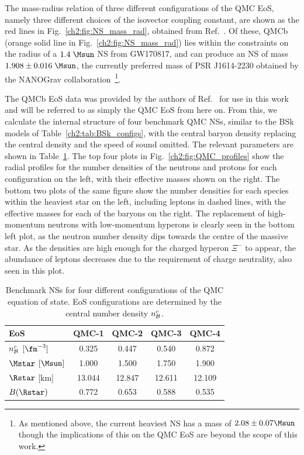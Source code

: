 The mass-radius relation of three different configurations of the QMC EoS, namely three different choices of the isovector coupling constant, are shown as the red lines in Fig.~\ref{ch2:fig:NS_mass_rad}, obtained from Ref.~\cite{Motta:2019tjc_Isovectoreffectsneutron}. Of these, QMCb (orange solid line in Fig.~\ref{ch2:fig:NS_mass_rad}) lies within the constraints on the radius of a $1.4\;\Msun$ NS from GW170817, and can produce an NS of mass $1.908 \pm 0.016\;\Msun$, the currently preferred mass of PSR J1614-2230 obtained by the NANOGrav collaboration~\cite{NANOGrav:2017wvv_apr_NANOGrav11yearData}\footnote{As mentioned above, the current heaviest NS has a mass of $2.08\pm 0.07\Msun$ though the implications of this on the QMC EoS are beyond the scope of this work.}.

The QMCb EoS data was provided by the authors of Ref.~\cite{Motta:2019tjc_Isovectoreffectsneutron} for use in this work and will be referred to as simply the QMC EoS from here on. From this, we calculate the internal structure of four benchmark QMC NSs, similar to the BSk models of Table~\ref{ch2:tab:BSk_configs}, with the central baryon density replacing the central density and the speed of sound omitted. The relevant parameters are shown in Table~\ref{ch2:tab:QMC_configs}. The top four plots in Fig.~\ref{ch2:fig:QMC_profiles} show the radial profiles for the number densities of the neutrons and protons for each configuration on the left, with their effective masses shown on the right. The bottom two plots of the same figure show the number densities for each species within the heaviest star on the left, including leptons in dashed lines, with the effective masses for each of the baryons on the right. The replacement of high-momentum neutrons with low-momentum hyperons is clearly seen in the bottom left plot, as the neutron number density dips towards the centre of the massive star. As the densities are high enough for the charged hyperon $\Xi^-$ to appear, the abundance of leptons decreases due to the requirement of charge neutrality, also seen in this plot. 

\begin{table}[t!bp]
    \centering
    \begin{tabular}{l c c c c}
    \toprule
    \bf EoS & \bf QMC-1 & \bf QMC-2 & \bf QMC-3 & \bf QMC-4 \\ \midrule\midrule
    $n_{\cal B}^c$ $[\fm^{-3}]$ & 0.325 & 0.447 & 0.540 & 0.872\\
    $\Mstar$ $[\Msun]$ & 1.000 & 1.500 & 1.750 & 1.900  \\
    $\Rstar$ [km] &  13.044 & 12.847 & 12.611 & 12.109 \\
    $B(\Rstar)$ & 0.772 & 0.653 & 0.588 & 0.535\\
    \bottomrule
    \end{tabular} 
    \caption{Benchmark NSs for four different configurations of the QMC equation of state. 
    EoS configurations are determined by the central number density $n_{\cal B}^c$.
    }
    \label{ch2:tab:QMC_configs}
\end{table} 

